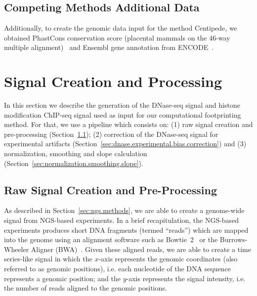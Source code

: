 \subsection{Competing Methods Additional Data}
\label{sec:competing.methods.additional.data}

Additionally, to create the genomic data input for the method Centipede, we obtained PhastCons conservation score (placental mammals on the 46-way multiple alignment)~\cite{siepel2005} and Ensembl gene annotation from ENCODE~\cite{hubbard2002}. 

\section{Signal Creation and Processing}
\label{sec:signal.creation.processing}

In this section we describe the generation of the DNase-seq signal and histone modification ChIP-seq signal used as input for our computational footprinting method. For that, we use a pipeline which consists on: (1) raw signal creation and pre-processing (Section~\ref{sec:raw.signal.creation.preprocessing}); (2) correction of the DNase-seq signal for experimental artifacts (Section~\ref{sec:dnase.experimental.bias.correction}) and (3) normalization, smoothing and slope calculation (Section~\ref{sec:normalization.smoothing.slope}).

\subsection{Raw Signal Creation and Pre-Processing}
\label{sec:raw.signal.creation.preprocessing}

As described in Section~\ref{sec:ngs.methods}, we are able to create a genome-wide signal from NGS-based experiments. In a brief recapitulation, the NGS-based experiments produces short DNA fragments (termed ``reads'') which are mapped into the genome using an alignment software such as Bowtie~2~\cite{langmead2012} or the Burrows-Wheeler Aligner (BWA)~\cite{li2009b}. Given these aligned reads, we are able to create a time series-like signal in which the $x$-axis represents the genomic coordinates (also referred to as genomic positions), i.e. each nucleotide of the DNA sequence represents a genomic position; and the $y$-axis represents the signal intensity, i.e. the number of reads aligned to the genomic positions.

